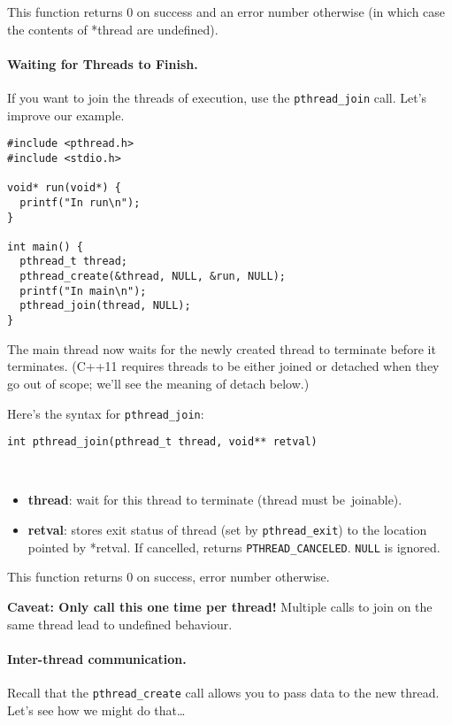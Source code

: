 \documentclass[11pt]{article}
\begin{document}
This function returns 0 on success and an error number otherwise (in
which case the contents of *thread are undefined).

\paragraph{Waiting for Threads to Finish.} If you want to join the threads
of execution, use the {\tt pthread\_join} call. Let's improve our example.

\begin{lstlisting}
#include <pthread.h>
#include <stdio.h>

void* run(void*) {
  printf("In run\n");
}

int main() {
  pthread_t thread;
  pthread_create(&thread, NULL, &run, NULL);
  printf("In main\n");
  pthread_join(thread, NULL);
}
\end{lstlisting}

The main thread now waits for the newly created thread to terminate
before it terminates. (C++11 requires threads to be either joined or
detached when they go out of scope; we'll see the meaning of detach below.)

Here's the syntax for {\tt pthread\_join}:

\begin{lstlisting}
int pthread_join(pthread_t thread, void** retval)
\end{lstlisting}
~\vspace*{-3em}
\begin{itemize}
\item  {\bf thread}: wait for this thread to terminate (thread must be~joinable).

\item  {\bf retval}: stores exit status of thread (set by {\tt pthread\_exit}) to
                 the location pointed by *retval. If cancelled, returns
                 {\tt PTHREAD\_CANCELED}. {\tt NULL} is ignored.
\end{itemize}

This function returns 0 on success, error number otherwise.

 {\bf Caveat: Only call this one time per thread!} Multiple calls to join on the same thread
  lead to undefined behaviour.

\paragraph{Inter-thread communication.} Recall that the {\tt pthread\_create} 
call allows you to pass data to the new thread. Let's see how we might do that\ldots
\end{document}
